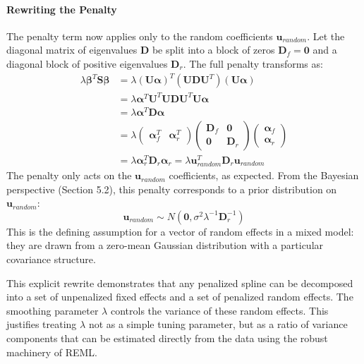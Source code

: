 \documentclass[11pt, a4paper]{article}
\begin{document}
\paragraph{Rewriting the Penalty}
The penalty term now applies only to the random coefficients $\mathbf{u}_{random}$. Let the diagonal matrix of eigenvalues $\mathbf{D}$ be split into a block of zeros $\mathbf{D}_f = \mathbf{0}$ and a diagonal block of positive eigenvalues $\mathbf{D}_r$. The full penalty transforms as:
\begin{align*}
    \lambda \boldsymbol{\beta}^T \mathbf{S} \boldsymbol{\beta} &= \lambda (\mathbf{U}\boldsymbol{\alpha})^T (\mathbf{U}\mathbf{D}\mathbf{U}^T) (\mathbf{U}\boldsymbol{\alpha}) \\
    &= \lambda \boldsymbol{\alpha}^T \mathbf{U}^T \mathbf{U}\mathbf{D}\mathbf{U}^T \mathbf{U} \boldsymbol{\alpha} \\
    &= \lambda \boldsymbol{\alpha}^T \mathbf{D} \boldsymbol{\alpha} \\
    &= \lambda \begin{pmatrix} \boldsymbol{\alpha}_f^T & \boldsymbol{\alpha}_r^T \end{pmatrix} \begin{pmatrix} \mathbf{D}_f & \mathbf{0} \\ \mathbf{0} & \mathbf{D}_r \end{pmatrix} \begin{pmatrix} \boldsymbol{\alpha}_f \\ \boldsymbol{\alpha}_r \end{pmatrix} \\
    &= \lambda \boldsymbol{\alpha}_r^T \mathbf{D}_r \boldsymbol{\alpha}_r = \lambda \mathbf{u}_{random}^T \mathbf{D}_r \mathbf{u}_{random}
\end{align*}
The penalty only acts on the $\mathbf{u}_{random}$ coefficients, as expected. From the Bayesian perspective (Section 5.2), this penalty corresponds to a prior distribution on $\mathbf{u}_{random}$:
\begin{equation*}
    \mathbf{u}_{random} \sim N(\mathbf{0}, \sigma^2 \lambda^{-1} \mathbf{D}_r^{-1})
\end{equation*}
This is the defining assumption for a vector of random effects in a mixed model: they are drawn from a zero-mean Gaussian distribution with a particular covariance structure.

This explicit rewrite demonstrates that any penalized spline can be decomposed into a set of unpenalized fixed effects and a set of penalized random effects. The smoothing parameter $\lambda$ controls the variance of these random effects. This justifies treating $\lambda$ not as a simple tuning parameter, but as a ratio of variance components that can be estimated directly from the data using the robust machinery of REML.
\end{document}
